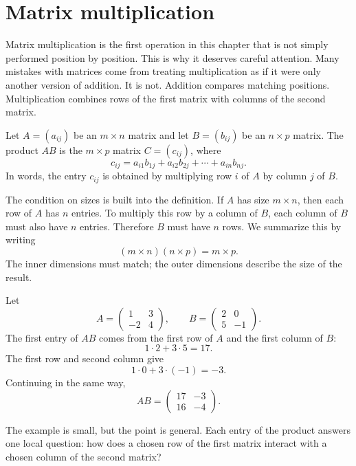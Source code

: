 \section{Matrix multiplication}

Matrix multiplication is the first operation in this chapter that is not simply performed position by position. This is why it deserves careful attention. Many mistakes with matrices come from treating multiplication as if it were only another version of addition. It is not. Addition compares matching positions. Multiplication combines rows of the first matrix with columns of the second matrix.

\begin{definitionbox}
Let \(A=(a_{ij})\) be an \(m\times n\) matrix and let \(B=(b_{ij})\) be an \(n\times p\) matrix. The product \(AB\) is the \(m\times p\) matrix \(C=(c_{ij})\), where
\[
c_{ij}=a_{i1}b_{1j}+a_{i2}b_{2j}+\cdots+a_{in}b_{nj}.
\]
In words, the entry \(c_{ij}\) is obtained by multiplying row \(i\) of \(A\) by column \(j\) of \(B\).
\end{definitionbox}

The condition on sizes is built into the definition. If \(A\) has size \(m\times n\), then each row of \(A\) has \(n\) entries. To multiply this row by a column of \(B\), each column of \(B\) must also have \(n\) entries. Therefore \(B\) must have \(n\) rows. We summarize this by writing
\[
(m\times n)(n\times p)=m\times p.
\]
The inner dimensions must match; the outer dimensions describe the size of the result.

\begin{examplebox}
Let
\[
A=\begin{pmatrix}1 & 3\\ -2 & 4\end{pmatrix},
\qquad
B=\begin{pmatrix}2 & 0\\ 5 & -1\end{pmatrix}.
\]
The first entry of \(AB\) comes from the first row of \(A\) and the first column of \(B\):
\[
1\cdot 2+3\cdot 5=17.
\]
The first row and second column give
\[
1\cdot 0+3\cdot (-1)=-3.
\]
Continuing in the same way,
\[
AB=
\begin{pmatrix}
17 & -3\\
16 & -4
\end{pmatrix}.
\]
\end{examplebox}

The example is small, but the point is general. Each entry of the product answers one local question: how does a chosen row of the first matrix interact with a chosen column of the second matrix?

